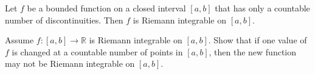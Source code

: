 \documentclass[12pt,a4paper]{article}
\begin{document}
\vspace{10pt}

\begin{theorem}
    Let $f$ be a bounded function on a closed interval $[a,b]$ that has only a countable number of discontinuities. Then $f$ is Riemann integrable on $[a,b]$.
    
\end{theorem}

\clearpage

\begin{problem}
    Assume $f: [a,b] \to \mathbb{R}$ is Riemann integrable on $[a,b]$. Show that if one value of $f$ is changed at a countable number of points in $[a,b]$, then the new function may not be Riemann integrable on $[a,b]$.
\end{problem}







\EndPage
\end{document}

